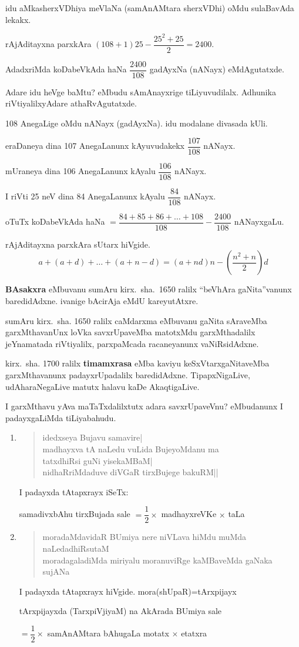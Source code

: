 idu aMkasherxVDhiya meVlaNa (samAnAMtara sherxVDhi) oMdu sulaBavAda lekakx.

rAjAditayxna parxkAra $(108+1)25-\dfrac{25^2+25}{2}=2400$.

AdadxriMda koDabeVkAda haNa $\dfrac{2400}{108}$ gadAyxNa (nANayx) eMdAgutatxde.

Adare idu heVge baMtu? eMbudu sAmAnayxrige tiLiyuvudilalx. Adhunika riVtiyalilxyAdare athaRvAgutatxde.

{\rm 108} AnegaLige oMdu nANayx (gadAyxNa). idu modalane divasada kUli.

eraDaneya dina {\rm 107} AnegaLanunx kAyuvudakekx $\dfrac{107}{108}$ nANayx.

mUraneya dina {\rm 106} AnegaLanunx kAyalu $\dfrac{106}{108}$ nANayx.

I riVti {\rm 25} neV dina {\rm 84} AnegaLanunx kAyalu $\dfrac{84}{108}$ nANayx.

oTuTx koDabeVkAda haNa $=\dfrac{84+85+86+\ldots+108}{108}-\dfrac{2400}{108}$ nANayxgaLu.

rAjAditayxna parxkAra sUtarx hiVgide.
$$
a+(a+d)+\ldots+(a+n-d)
=(a+nd)n- \left(\dfrac{n^2+n}{2} \right)d
$$

\textbf{BAsakxra} eMbuvanu sumAru kirx.~sha.~{\rm 1650} ralilx ``beVhAra gaNita''vanunx baredi\-dAdxne. ivanige bAcirAja eMdU kareyutAtxre. 

sumAru kirx.~sha. {\rm 1650} ralilx caMdarxma eMbuvanu gaNita sAraveMba garxMthavanUnx loVka savxrUpaveMba matotxMdu garxMthadalilx jeYnamatada riVtiyalilx, parxpaMcada racaneyanunx vaNiRsidAdxne.

kirx.~sha. {\rm 1700} ralilx \textbf{timamxrasa} eMba kaviyu keSxVtarxgaNitaveMba garxMthavanunx padayxrUpa\-dalilx baredidAdxne. TipapxNigaLive, udAharaNegaLive matutx halavu kaDe AkaqtigaLive.
\newpage

I garxMthavu yAva maTaTxdalilxtutx adara savxrUpaveVnu? eMbudanunx I padayx\-gaLiMda tiLiyabahudu.
\begin{enumerate}[\rm 1)]
\item 
\begin{verse}
idedxseya Bujavu samavire|\\
madhayxva tA naLedu vuLida BujeyoMdanu ma\\
tatxdhiRsi guNi yisekaMBaM|\\
nidhaRriMdaduve diVGaR tirxBujege bakuRM||
\end{verse}
I padayxda tAtapxrayx iSeTx: 

samadivxbAhu tirxBujada sale $=\dfrac{1}{2}\times$ madhayxreVKe $\times$ taLa

\item 
\begin{verse}
moradaMdavidaR BUmiya nere niVLava hiMdu muMda naLe\-dadhiRsutaM\\
moradagaladiMda miriyalu moranuviRge kaMBaveMda gaNaka sujANa
\end{verse}

I padayxda tAtapxrayx hiVgide. \qquad mora(shUpaR)=tArxpijayx

tArxpijayxda (TarxpiVjiyaM) na AkArada BUmiya sale 

$=\dfrac{1}{2}\times$ samAnAMtara bAhugaLa motatx $\times$ etatxra
\end{enumerate}

